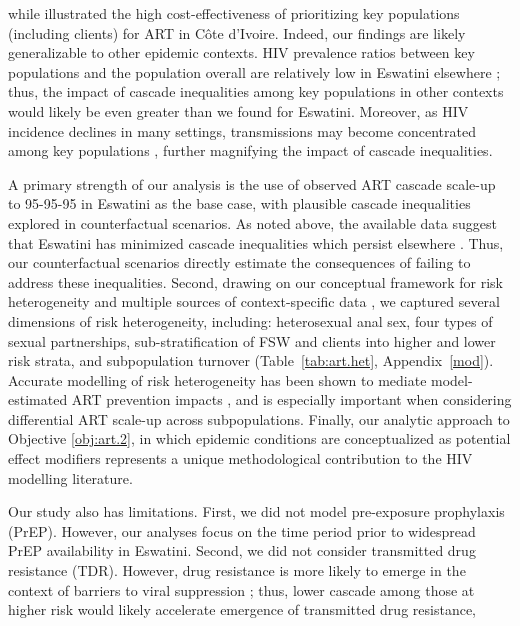while \citet{Maheu-Giroux2019cost} illustrated the high cost-effectiveness of
prioritizing key populations (including clients) for ART in C\^{o}te d’Ivoire.
Indeed, our findings are likely generalizable to other epidemic contexts.
HIV prevalence ratios between key populations and the population overall
are relatively low in Eswatini \vs elsewhere \cite{Baral2012,Hessou2019};
thus, the impact of cascade inequalities among key populations in other contexts
would likely be even greater than we found for Eswatini.
Moreover, as HIV incidence declines in many settings,
transmissions may become concentrated among key populations \cite{Brown2019,Garnett2021},
further magnifying the impact of cascade inequalities.
\par
A primary strength of our analysis is the use of
observed ART cascade scale-up to 95-95-95 in Eswatini as the base case,
with plausible cascade inequalities explored in counterfactual scenarios.
As noted above, the available data suggest that Eswatini has
minimized cascade inequalities which persist elsewhere \cite{Hakim2018}.
Thus, our counterfactual scenarios directly estimate
the consequences of failing to address these inequalities.
Second, drawing on our conceptual framework for risk heterogeneity \cite[Table~1]{Knight2022sr}
and multiple sources of context-specific data
\cite{SDHS2006,SHIMS1,SHIMS2,Baral2014,EswKP2014,EswIBBS2022},
we captured several dimensions of risk heterogeneity, including:
heterosexual anal sex,
four types of sexual partnerships,
sub-stratification of FSW and clients into higher and lower risk strata,
and subpopulation turnover
(Table~\ref{tab:art.het}, Appendix~\ref{mod}).
Accurate modelling of risk heterogeneity
has been shown to mediate model-estimated ART prevention impacts \cite{Hontelez2013},
and is especially important when considering differential ART scale-up across subpopulations.
Finally, our analytic approach to Objective \ref{obj:art.2},
in which epidemic conditions are conceptualized as potential effect modifiers
represents a unique methodological contribution to the HIV modelling literature.
\par
Our study also has limitations.
First, we did not model pre-exposure prophylaxis (PrEP).
However, our analyses focus on the time period
prior to widespread PrEP availability in Eswatini.
Second, we did not consider transmitted drug resistance (TDR).
However, drug resistance is more likely to emerge
in the context of barriers to viral suppression \cite{Pham2014};
thus, lower cascade among those at higher risk
would likely accelerate emergence of transmitted drug resistance,
